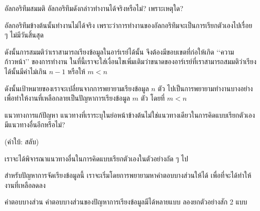 \begin{quiz}{อัล{\wbr}กอ{\wbr}ริ{\wbr}ทึม{\wbr}สมมติ}
อัล{\wbr}กอ{\wbr}ริ{\wbr}ทึม{\wbr}ดังกล่าว{\wbr}ทำงาน{\wbr}ได้{\wbr}จริง{\wbr}หรือ{\wbr}ไม่? เพราะ{\wbr}เหตุใด?
\end{quiz}

อัล{\wbr}กอ{\wbr}ริ{\wbr}ทึม{\wbr}ข้างต้น{\wbr}นั้น{\wbr}ทำงาน{\wbr}ไม่{\wbr}ได้{\wbr}จริง{\wbr}
เพราะว่า{\wbr}การ{\wbr}ทำงาน{\wbr}ของ{\wbr}อัล{\wbr}กอ{\wbr}ริ{\wbr}ทึม{\wbr}จะ{\wbr}เป็น{\wbr}การ{\wbr}เรียก{\wbr}ตัวเอง{\wbr}ไป{\wbr}เรื่อย ๆ ไม่{\wbr}มี{\wbr}วัน{\wbr}สิ้นสุด{\wbr}

ดังนั้น{\wbr}การ{\wbr}สมมติ{\wbr}ว่า{\wbr}เรา{\wbr}สามารถ{\wbr}เรียง{\wbr}ข้อมูล{\wbr}ใน{\wbr}อาร์เรย์{\wbr}ได้{\wbr}นั้น จึง{\wbr}ต้อง{\wbr}มี{\wbr}ขอบเขต{\wbr}ที่{\wbr}ก่อ{\wbr}ให้{\wbr}เกิด{\wbr}
`{\wbr}`{\wbr}ความ{\wbr}ก้าวหน้า'' ของ{\wbr}การ{\wbr}ทำงาน{\wbr}
ใน{\wbr}ที่นี้{\wbr}เรา{\wbr}จะ{\wbr}ใส่{\wbr}เงื่อนไข{\wbr}เพิ่มเติม{\wbr}ว่า{\wbr}ขนาด{\wbr}ของ{\wbr}อาร์เรย์{\wbr}ที่{\wbr}เรา{\wbr}สามารถ{\wbr}สมมติ{\wbr}ว่า{\wbr}เรียง{\wbr}ได้{\wbr}นั้น{\wbr}มี{\wbr}ค่า{\wbr}ไม่{\wbr}เกิน{\wbr}
$n-1$ หรือ{\wbr}ให้ $m < n$

ดังนั้น{\wbr}เป้าหมาย{\wbr}ของ{\wbr}เรา{\wbr}จะ{\wbr}เปลี่ยน{\wbr}จาก{\wbr}การ{\wbr}พยายาม{\wbr}เรียง{\wbr}ข้อมูล $n$ ตัว{\wbr}
ไป{\wbr}เป็น{\wbr}การ{\wbr}พยายาม{\wbr}ทำงาน{\wbr}บาง{\wbr}อย่าง เพื่อ{\wbr}ทำ{\wbr}ให้{\wbr}งาน{\wbr}ที่{\wbr}เหลือก{\wbr}ลาย{\wbr}เป็น{\wbr}ปัญหา{\wbr}การ{\wbr}เรียง{\wbr}ข้อมูล $m$
ตัว โดย{\wbr}ที่ $m<n$

\begin{quiz}{แนวทาง{\wbr}การ{\wbr}แก้{\wbr}ปัญหา}
แนวทาง{\wbr}ที่{\wbr}เรา{\wbr}ระบุ{\wbr}ใน{\wbr}ย่อหน้า{\wbr}ข้างต้น{\wbr}ไม่{\wbr}ใช่{\wbr}แนวทาง{\wbr}เดียว{\wbr}ใน{\wbr}การ{\wbr}คิด{\wbr}แบบ{\wbr}เรียก{\wbr}ตัวเอง มี{\wbr}แนวทาง{\wbr}อื่น{\wbr}อีก{\wbr}หรือ{\wbr}ไม่?

(คำ{\wbr}ใบ้: สลับ)
\end{quiz}

เรา{\wbr}จะ{\wbr}ได้{\wbr}พิจารณา{\wbr}แนวทาง{\wbr}อื่น{\wbr}ใน{\wbr}การ{\wbr}คิด{\wbr}แบบ{\wbr}เรียก{\wbr}ตัวเอง{\wbr}ใน{\wbr}ตัวอย่าง{\wbr}ถัด ๆ ไป  

สำหรับ{\wbr}ปัญหา{\wbr}การ{\wbr}จัดเรียง{\wbr}ข้อมูล{\wbr}นี้ เรา{\wbr}จะ{\wbr}เริ่ม{\wbr}โดย{\wbr}การ{\wbr}พยายาม{\wbr}หา{\wbr}คำตอบ{\wbr}บาง{\wbr}ส่วน{\wbr}ให้{\wbr}ได้{\wbr}
เพื่อที่จะ{\wbr}ได้{\wbr}ทำ{\wbr}ให้{\wbr}งาน{\wbr}ที่{\wbr}เหลือ{\wbr}ลด{\wbr}ลง{\wbr}

\begin{quiz}{คำตอบ{\wbr}บาง{\wbr}ส่วน}
คำตอบ{\wbr}บาง{\wbr}ส่วน{\wbr}ของ{\wbr}ปัญหา{\wbr}การ{\wbr}เรียง{\wbr}ข้อมูล{\wbr}มี{\wbr}ได้{\wbr}หลาย{\wbr}แบบ ลอง{\wbr}ยก{\wbr}ตัวอย่าง{\wbr}สัก 2 แบบ{\wbr}
\end{quiz}

